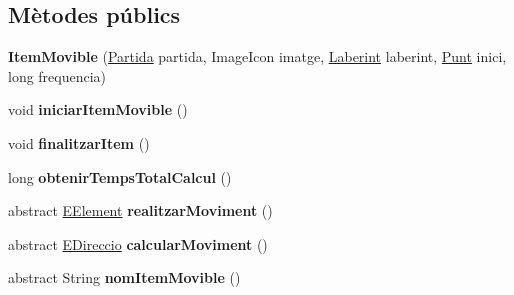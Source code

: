 \subsection*{Mètodes públics}
\begin{DoxyCompactItemize}
\item 
\hypertarget{classlogica_1_1_item_movible_a0463ef4d0a9e8e652be4a19b8dfba67c}{{\bfseries Item\+Movible} (\hyperlink{classlogica_1_1_partida}{Partida} partida, Image\+Icon imatge, \hyperlink{classlogica_1_1laberints_1_1_laberint}{Laberint} laberint, \hyperlink{classlogica_1_1_punt}{Punt} inici, long frequencia)}\label{classlogica_1_1_item_movible_a0463ef4d0a9e8e652be4a19b8dfba67c}

\item 
\hypertarget{classlogica_1_1_item_movible_a9a43835d32363d837ad38635e48483ba}{void {\bfseries iniciar\+Item\+Movible} ()}\label{classlogica_1_1_item_movible_a9a43835d32363d837ad38635e48483ba}

\item 
\hypertarget{classlogica_1_1_item_movible_a3362abf376e2d3fcf4b0690954e8c933}{void {\bfseries finalitzar\+Item} ()}\label{classlogica_1_1_item_movible_a3362abf376e2d3fcf4b0690954e8c933}

\item 
\hypertarget{classlogica_1_1_item_movible_a1284fadbe7d3961544c7b6edfa69340c}{long {\bfseries obtenir\+Temps\+Total\+Calcul} ()}\label{classlogica_1_1_item_movible_a1284fadbe7d3961544c7b6edfa69340c}

\item 
\hypertarget{classlogica_1_1_item_movible_aa1d46015999f809171a3ad284e249670}{abstract \hyperlink{enumlogica_1_1enumeracions_1_1_e_element}{E\+Element} {\bfseries realitzar\+Moviment} ()}\label{classlogica_1_1_item_movible_aa1d46015999f809171a3ad284e249670}

\item 
\hypertarget{classlogica_1_1_item_movible_a7851f12b803fe2c87550658ce83c6853}{abstract \hyperlink{enumlogica_1_1enumeracions_1_1_e_direccio}{E\+Direccio} {\bfseries calcular\+Moviment} ()}\label{classlogica_1_1_item_movible_a7851f12b803fe2c87550658ce83c6853}

\item 
\hypertarget{classlogica_1_1_item_movible_a2b829b28d6b604e11b8135b78ce8f7eb}{abstract String {\bfseries nom\+Item\+Movible} ()}\label{classlogica_1_1_item_movible_a2b829b28d6b604e11b8135b78ce8f7eb}

\end{DoxyCompactItemize}
